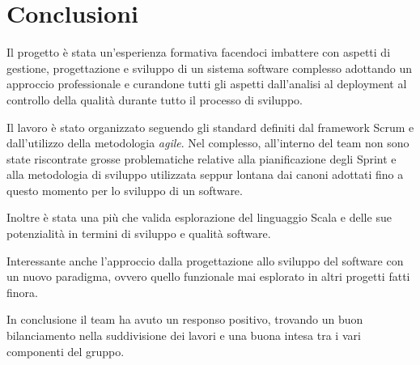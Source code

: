 \chapter{Conclusioni}
Il progetto è stata un'esperienza formativa facendoci imbattere con aspetti di gestione, progettazione e sviluppo di un sistema software complesso adottando un approccio professionale e curandone tutti gli aspetti dall'analisi al deployment al controllo della qualità durante tutto il processo di sviluppo.

Il lavoro è stato organizzato seguendo gli standard definiti dal framework Scrum e dall’utilizzo della metodologia \textit{agile}. Nel complesso, all’interno del team non sono state riscontrate grosse problematiche relative alla pianificazione degli Sprint e alla metodologia di sviluppo utilizzata seppur lontana dai canoni adottati fino a questo momento per lo sviluppo di un software.

Inoltre è stata una più che valida esplorazione del linguaggio Scala e delle sue potenzialità in termini di sviluppo e qualità software.

Interessante anche l'approccio dalla progettazione allo sviluppo del software con un nuovo paradigma, ovvero quello funzionale mai esplorato in altri progetti fatti finora.

In conclusione il team ha avuto un responso positivo, trovando un buon bilanciamento nella suddivisione dei lavori e una buona intesa tra i vari componenti del gruppo.
